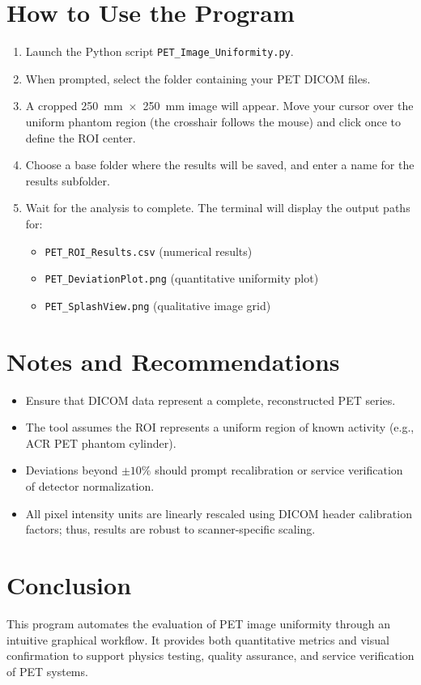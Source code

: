 \documentclass[12pt]{article}
\begin{document}
\section{How to Use the Program}
\begin{enumerate}
    \item Launch the Python script \texttt{PET\_Image\_Uniformity.py}.
    \item When prompted, select the folder containing your PET DICOM files.
    \item A cropped 250~mm~$\times$~250~mm image will appear. Move your cursor over the uniform phantom region (the crosshair follows the mouse) and click once to define the ROI center.
    \item Choose a base folder where the results will be saved, and enter a name for the results subfolder.
    \item Wait for the analysis to complete. The terminal will display the output paths for:
    \begin{itemize}
        \item \texttt{PET\_ROI\_Results.csv} (numerical results)
        \item \texttt{PET\_DeviationPlot.png} (quantitative uniformity plot)
        \item \texttt{PET\_SplashView.png} (qualitative image grid)
    \end{itemize}
\end{enumerate}

\section{Notes and Recommendations}
\begin{itemize}
    \item Ensure that DICOM data represent a complete, reconstructed PET series.
    \item The tool assumes the ROI represents a uniform region of known activity (e.g., ACR PET phantom cylinder).
    \item Deviations beyond $\pm10\%$ should prompt recalibration or service verification of detector normalization.
    \item All pixel intensity units are linearly rescaled using DICOM header calibration factors; thus, results are robust to scanner-specific scaling.
\end{itemize}

\section{Conclusion}
This program automates the evaluation of PET image uniformity through an intuitive graphical workflow. It provides both quantitative metrics and visual confirmation to support physics testing, quality assurance, and service verification of PET systems.
\end{document}

